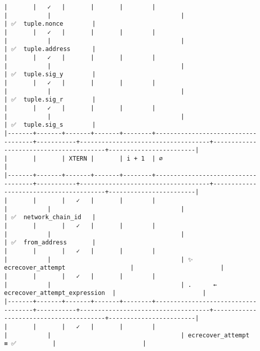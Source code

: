 \documentclass[varwidth=\maxdimen,margin=0.5cm,multi={verbatim}]{standalone}
\begin{document}
\begin{verbatim}
|       |   ✓   |       |       |        |                                    |           |                                    |                                        | ✅  tuple.nonce        |
|       |   ✓   |       |       |        |                                    |           |                                    |                                        | ✅  tuple.address      |
|       |   ✓   |       |       |        |                                    |           |                                    |                                        | ✅  tuple.sig_y        |
|       |   ✓   |       |       |        |                                    |           |                                    |                                        | ✅  tuple.sig_r        |
|       |   ✓   |       |       |        |                                    |           |                                    |                                        | ✅  tuple.sig_s        |
|-------+-------+-------+-------+--------+------------------------------------+-----------+------------------------------------+----------------------------------------+------------------------|
|       |       | XTERN |       | i + 1  | ∅                                  |
|-------+-------+-------+-------+--------+------------------------------------+-----------+------------------------------------+----------------------------------------+------------------------|
|       |       |   ✓   |       |        |                                    |           |                                    |                                        | ✅  network_chain_id   |
|       |       |   ✓   |       |        |                                    |           |                                    |                                        | ✅  from_address       |
|       |       |   ✓   |       |        |                                    |           |                                    | ✨  ecrecover_attempt                  |                        |
|       |       |   ✓   |       |        |                                    |           |                                    | .      ← ecrecover_attempt_expression  |                        |
|-------+-------+-------+-------+--------+------------------------------------+-----------+------------------------------------+----------------------------------------+------------------------|
|       |       |   ✓   |       |        |                                    |           |                                    | ecrecover_attempt        ≡ ✅          |                        |

\end{verbatim}
\end{document}
